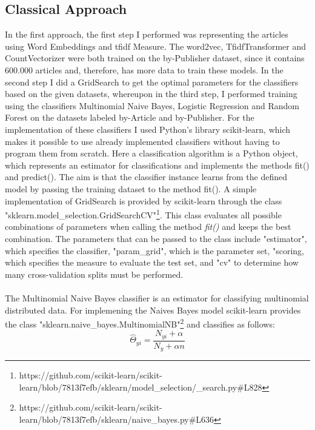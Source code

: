 \documentclass[a4paper, 11pt,titlepage,oneside,openany]{book}
\begin{document}
\subsection{Classical Approach}
In the first approach, the first step I performed was representing the articles using Word Embeddings and \gls{tfidf} Measure. The word2vec, TfidfTransformer and CountVectorizer were both trained on the by-Publisher dataset, since it contains 600.000  articles and, therefore, has more data to train these models. In the second step I did a GridSearch to get the optimal parameters for the classifiers based on the given datasets, whereupon in the third step, I performed training using the classifiers Multinomial Naive Bayes, Logistic Regression and Random Forest on the datasets labeled by-Article and by-Publisher. For the implementation of these classifiers I used Python's library scikit-learn, which makes it possible to use already implemented classifiers without having to program them from scratch. Here a classification algorithm is a Python object, which represents an estimator for classifications and implements the methods fit() and predict(). The aim is that the classifier instance learns from the defined model by passing the training dataset to the method fit().
\newpage
\indent A simple implementation of GridSearch is provided by scikit-learn through the class "sklearn.model\_selection.GridSearchCV"\footnote{https://github.com/scikit-learn/scikit-learn/blob/7813f7efb/sklearn/model\_selection/\_search.py\#L828}. This class evaluates all possible combinations of parameters when calling the method \textit{fit()} and keeps the best combination. The parameters that can be passed to the class include "estimator", which specifies the classifier, "param\_grid", which is the parameter set, "scoring, which specifies the measure to evaluate the test set, and "cv" to determine how many cross-validation splits must be performed. \\
\\
\indent The Multinomial Naive Bayes classifier is an estimator for classifying multinomial distributed data. For implemening the Naives Bayes model scikit-learn provides the class "sklearn.naive\_bayes.MultinomialNB"\footnote{https://github.com/scikit-learn/scikit-learn/blob/7813f7efb/sklearn/naive\_bayes.py\#L636} and classifies as follows:
\[
\hat{\Theta}_{yi}=\frac{N_{yi}+\alpha}{N_y + \alpha n}
\]
\end{document}
